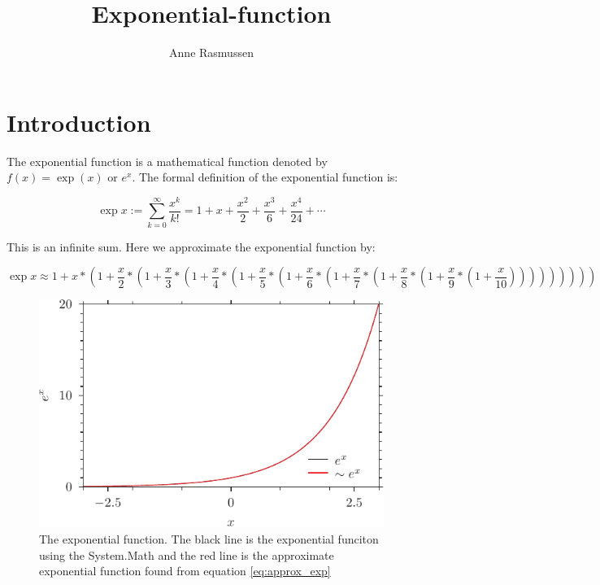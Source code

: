 \documentclass[a4paper]{article}
\begin{document}
\title{Exponential-function}
\author{Anne Rasmussen}
\maketitle


\section{Introduction}

The exponential function is a mathematical function denoted by
$f(x)=\exp(x)$ or $e^x$. The formal definition of the exponential function is: 

\begin{equation}
\exp x := \sum_{k = 0}^{\infty} \frac{x^k}{k!} = 1 + x + \frac{x^2}{2} + \frac{x^3}{6} + \frac{x^4}{24} + \cdots
\end{equation}

This is an infinite sum. Here we approximate the exponential function by: 

\begin{equation} \label{eq:approx_exp}
\exp x \approx 1+x*\left(1+\frac{x}{2}*\left(1+\frac{x}{3}*\left(1+\frac{x}{4}*\left(1+\frac{x}{5}*\left(1+\frac{x}{6}*\left(1+\frac{x}{7}*\left(1+\frac{x}{8}*\left(1+\frac{x}{9}*\left(1+\frac{x}{10}\right)\right)\right)\right)\right)\right)\right)\right)\right)
\end{equation}



\begin{figure}[!h]
\centering
\includegraphics{exp.pdf}
\caption{The exponential function. The black line is the exponential funciton using the System.Math and the red line is the approximate exponential function found from equation \eqref{eq:approx_exp}}
\end{figure}
\end{document}
